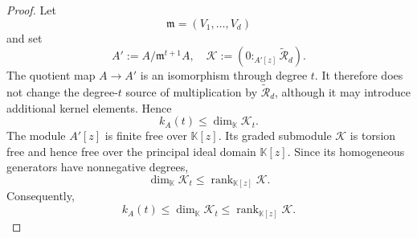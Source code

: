 \documentclass[10pt,a4paper]{amsart}
\newcommand\K{\ensuremath{\mathbb{K}}}
\begin{document}
\begin{proof}
Let
\begin{equation*}
    \mathfrak{m}=(V_1,\ldots,V_d)
\end{equation*}
and set
\begin{equation*}
    A':=A/\mathfrak{m}^{t+1}A,
    \quad
    \mathcal K:=
    \left(0:_{A'[z]}\widetilde{\mathcal R}_d\right).
\end{equation*}
The quotient map $A\to A'$ is an isomorphism through degree $t$.
It therefore does not change the degree-$t$ source of multiplication by
$\widetilde{\mathcal R}_d$, although it may introduce additional kernel
elements. Hence
\begin{equation*}
    k_A(t)
    \leq
    \dim_{\K}\mathcal K_t.
\end{equation*}
The module $A'[z]$ is finite free over $\K[z]$. Its graded submodule
$\mathcal K$ is torsion free and hence free over the principal ideal
domain $\K[z]$. Since its homogeneous generators have nonnegative
degrees,
\begin{equation*}
    \dim_{\K}\mathcal K_t
    \leq
    \operatorname{rank}_{\K[z]}\mathcal K.
\end{equation*}
Consequently,
\begin{equation*}
    k_A(t)
    \leq
    \dim_{\K}\mathcal K_t
    \leq
    \operatorname{rank}_{\K[z]}\mathcal K.
\end{equation*}





\end{proof}
\end{document}
